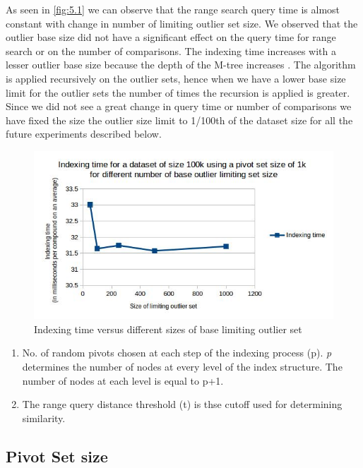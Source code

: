 As seen in \ref{fig:5.1} we can observe that the range search query time is almost constant with change in number of limiting outlier set size. We observed that the outlier base size did not have a significant effect on the query time for range search or on the number of comparisons. The indexing time increases with a lesser outlier base size because the depth of the M-tree increases . The algorithm is applied recursively on the outlier sets, hence when we have a lower base size limit for the outlier sets the number of times the recursion is applied is greater. Since we did not see a great change in query time or number of comparisons we have fixed the size the outlier size limit to 1/100th of the dataset size for all the future experiments described below.
\begin{figure}[ht]	
\centering
\includegraphics[width=1 \columnwidth]{img/image8.jpg}
\caption{Indexing time versus different sizes of base limiting outlier set}
\label{fig:5.2}
\end{figure}
\begin{enumerate}

	\item No. of random pivots chosen at each step of the indexing process (p). \textit{p} determines the number of nodes at every level of the index structure. The number of nodes at each level is equal to p+1.

	\item The range query distance threshold (t)	is thse cutoff used for determining similarity.\\
\end{enumerate}




\subsection{Pivot Set size}

